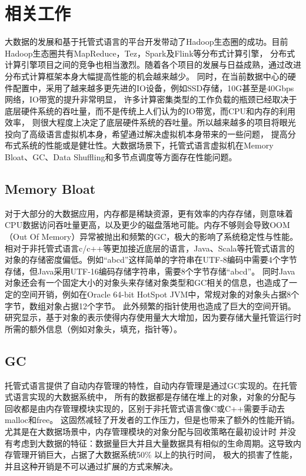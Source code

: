 
\chapter{相关工作}
大数据的发展和基于托管式语言的平台开发带动了Hadoop生态圈的成功。目前Hadoop生态圈共有MapReduce，Tez，Spark及Flink等分布式计算引擎，
分布式计算引擎项目之间的竞争也相当激烈。随着各个项目的发展与日益成熟，通过改进分布式计算框架本身大幅提高性能的机会越来越少。
同时，在当前数据中心的硬件配置中，采用了越来越多更先进的IO设备，例如SSD存储，10G甚至是40Gbps网络，IO带宽的提升非常明显，
许多计算密集类型的工作负载的瓶颈已经取决于底层硬件系统的吞吐量，而不是传统上人们认为的IO带宽，而CPU和内存的利用效率，
则很大程度上决定了底层硬件系统的吞吐量。所以越来越多的项目将眼光投向了高级语言虚拟机本身，希望通过解决虚拟机本身带来的一些问题，
提高分布式系统的性能或是健壮性。大数据场景下，托管式语言虚拟机在Memory Bloat、GC、Data Shuffling和多节点调度等方面存在性能问题。

\section{Memory Bloat}
对于大部分的大数据应用，内存都是稀缺资源，更有效率的内存存储，则意味着CPU数据访问吞吐量更高，以及更少的磁盘落地可能。内存不够则会导致OOM（Out Of Memory）异常被抛出和频繁的GC，极大的影响了系统稳定性与性能。
相对于非托管式语言c/c++等更加接近底层的语言，Java、Scala等托管式语言的对象的存储密度偏低。例如“abcd”这样简单的字符串在UTF-8编码中需要4个字节存储，但Java采用UTF-16编码存储字符串，需要8个字节存储“abcd”\cite{xin2015project,rosendeep}。
同时Java对象还会有一个固定大小的对象头来存储对象类型和GC相关的信息，也造成了一定的空间开销，例如在Oracle 64-bit HotSpot JVM中，常规对象的对象头占据8个字节，数组对象占据12个字节\cite{nguyen2019compiler}。
此外频繁的指针使用也造成了巨大的空间开销。研究显示\cite{bu2013bloat, mitchell2007causes}，基于对象的表示使得内存使用量大大增加，因为要存储大量托管运行时所需的额外信息（例如对象头，填充，指针等）。

\section{GC}
托管式语言提供了自动内存管理的特性，自动内存管理是通过GC实现的。在托管式语言实现的大数据系统中，
所有的数据都是存储在堆上的对象，对象的分配与回收都是由内存管理模块实现的，区别于非托管式语言像C或C++需要手动去malloc和free。
这固然减轻了开发者的工作压力，但是也带来了额外的性能开销。尤其是在大数据场景中，内存管理模块的对象分配与回收策略在最初设计时
并没有考虑到大数据的特征：数据量巨大并且大量数据具有相似的生命周期。这导致内存管理开销巨大，占据了大数据系统50\% 以上的执行时间，
极大的损害了性能，并且这种开销是不可以通过扩展的方式来解决。

